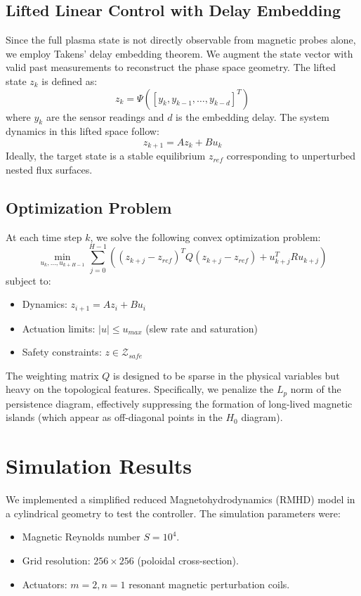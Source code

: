 \documentclass{article}
\begin{document}
\subsection{Lifted Linear Control with Delay Embedding}
Since the full plasma state is not directly observable from magnetic probes alone, we employ Takens' delay embedding theorem. We augment the state vector with valid past measurements to reconstruct the phase space geometry. The lifted state $z_k$ is defined as:
\begin{equation}
    z_k = \Psi([y_k, y_{k-1}, \dots, y_{k-d}]^T)
\end{equation}
where $y_k$ are the sensor readings and $d$ is the embedding delay. The system dynamics in this lifted space follow:
\begin{equation}
    z_{k+1} = A z_k + B u_k
\end{equation}
Ideally, the target state is a stable equilibrium $z_{ref}$ corresponding to unperturbed nested flux surfaces.

\subsection{Optimization Problem}
At each time step $k$, we solve the following convex optimization problem:
\begin{equation}
    \min_{u_k, \dots, u_{k+H-1}} \sum_{j=0}^{H-1} \left( (z_{k+j} - z_{ref})^T Q (z_{k+j} - z_{ref}) + u_{k+j}^T R u_{k+j} \right)
\end{equation}
subject to:
\begin{itemize}
    \item Dynamics: $z_{i+1} = A z_i + B u_i$
    \item Actuation limits: $|u| \le u_{max}$ (slew rate and saturation)
    \item Safety constraints: $z \in \mathcal{Z}_{safe}$
\end{itemize}
The weighting matrix $Q$ is designed to be sparse in the physical variables but heavy on the topological features. Specifically, we penalize the $L_p$ norm of the persistence diagram, effectively suppressing the formation of long-lived magnetic islands (which appear as off-diagonal points in the $H_0$ diagram).

\section{Simulation Results}
We implemented a simplified reduced Magnetohydrodynamics (RMHD) model in a cylindrical geometry to test the controller. The simulation parameters were:
\begin{itemize}
    \item Magnetic Reynolds number $S = 10^4$.
    \item Grid resolution: $256 \times 256$ (poloidal cross-section).
    \item Actuators: $m=2, n=1$ resonant magnetic perturbation coils.
\end{itemize}
\end{document}
